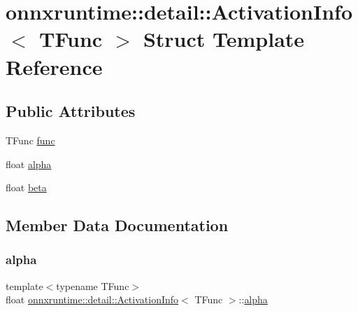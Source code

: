 \hypertarget{structonnxruntime_1_1detail_1_1ActivationInfo}{}\section{onnxruntime\+:\+:detail\+:\+:Activation\+Info$<$ T\+Func $>$ Struct Template Reference}
\label{structonnxruntime_1_1detail_1_1ActivationInfo}
\subsection*{Public Attributes}
\begin{DoxyCompactItemize}
\item 
T\+Func \mbox{\hyperlink{structonnxruntime_1_1detail_1_1ActivationInfo_aca31c46eedd34ac66255b1c90736f60f}{func}}
\item 
float \mbox{\hyperlink{structonnxruntime_1_1detail_1_1ActivationInfo_aaceff1564f554ae48da891ce1674a018}{alpha}}
\item 
float \mbox{\hyperlink{structonnxruntime_1_1detail_1_1ActivationInfo_a7e6eadd6c8fdb991ac31d47a83fecb3a}{beta}}
\end{DoxyCompactItemize}


\subsection{Member Data Documentation}
\mbox{\label{structonnxruntime_1_1detail_1_1ActivationInfo_aaceff1564f554ae48da891ce1674a018}} 
\subsubsection{\texorpdfstring{alpha}{alpha}}
{\footnotesize\ttfamily template$<$typename T\+Func$>$ \\
float \mbox{\hyperlink{structonnxruntime_1_1detail_1_1ActivationInfo}{onnxruntime\+::detail\+::\+Activation\+Info}}$<$ T\+Func $>$\+::\mbox{\hyperlink{mlasi_8h_a1763355f32e1812e5cb3a0080e7cca12}{alpha}}}

\mbox{\label{structonnxruntime_1_1detail_1_1ActivationInfo_a7e6eadd6c8fdb991ac31d47a83fecb3a}} 
